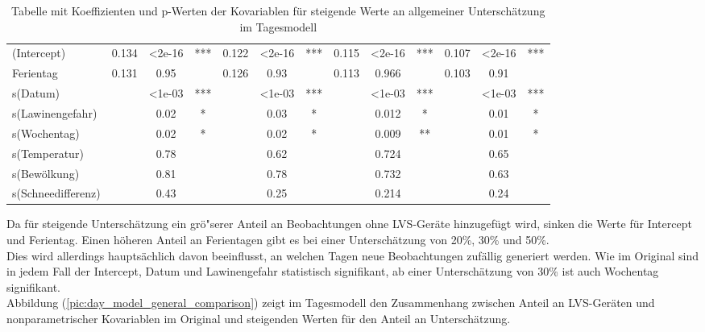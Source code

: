 \documentclass[12pt]{scrreprt}
\begin{document}
\begin{table}[H]
\begin{adjustbox}{max width=\textwidth}
\begin{tabular}{l|ccc|ccc|ccc|ccc|}
		\cmidrule{2-13}    (Intercept) & 0.134 & <2e-16 & ***   & 0.122 & <2e-16 & ***   & 0.115 & <2e-16 & ***   & 0.107 & <2e-16 & *** \\
		Ferientag & 0.131 & 0.95  &       & 0.126 & 0.93  &       & 0.113 & 0.966 &       & 0.103 & 0.91  &   \\
		s(Datum) &       & <1e-03 & ***   &       & <1e-03 & ***   &       & <1e-03 & ***   &       & <1e-03 & *** \\
		s(Lawinengefahr) &       & 0.02  & *     &       & 0.03  & *     &       & 0.012 & *     &       & 0.01  & * \\
		s(Wochentag) &       & 0.02  & *     &       & 0.02  & *     &       & 0.009 & **    &       & 0.01  & * \\
		s(Temperatur) &       & 0.78  &       &       & 0.62  &       &       & 0.724 &       &       & 0.65  &   \\
		s(Bewölkung) &       & 0.81  &       &       & 0.78  &       &       & 0.732 &       &       & 0.63  &   \\
		s(Schneedifferenz) &       & 0.43  &       &       & 0.25  &       &       & 0.214 &       &       & 0.24  &   \\
		\cmidrule{2-13}    
	\end{tabular}%
	\end{adjustbox}
	\caption{Tabelle mit Koeffizienten und p-Werten der Kovariablen für steigende Werte an allgemeiner Unterschätzung im Tagesmodell}
	\label{tab:Szenario 1 im Tagesmodell}%
\end{table}%

\noindent Da für steigende Unterschätzung ein grö"serer Anteil an Beobachtungen ohne LVS-Geräte hinzugefügt wird, sinken die Werte für Intercept und Ferientag. Einen höheren Anteil an Ferientagen gibt es bei einer Unterschätzung von 20\%, 30\% und 50\%. \\
Dies wird allerdings hauptsächlich davon beeinflusst, an welchen Tagen neue Beobachtungen zufällig generiert werden. Wie im Original sind in jedem Fall der Intercept, Datum und Lawinengefahr statistisch signifikant, ab einer Unterschätzung von 30\% ist auch Wochentag signifikant.\\
Abbildung (\ref{pic:day_model_general_comparison}) zeigt im Tagesmodell den Zusammenhang zwischen Anteil an LVS-Geräten und nonparametrischer Kovariablen im Original und steigenden Werten für den Anteil an Unterschätzung.
\end{document}
